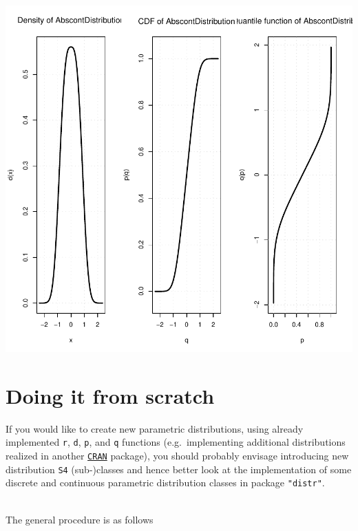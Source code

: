 \documentclass[10pt]{article}
\def\pkg#1{{\tt "#1"}}
\begin{document}
\includegraphics{newDistributions-AbscDist}
%
\section{Doing it from scratch}
If you would like to create new parametric distributions, using already 
implemented {\tt r}, {\tt d}, {\tt p}, and {\tt q} functions
(e.g.\ implementing additional distributions realized in another 
\href{http://cran.r-project.org}{\tt CRAN} package), 
you should probably envisage introducing new distribution {\tt S4} (sub-)classes
and hence better look at the implementation of some discrete and 
continuous parametric distribution classes in package \pkg{distr}.

\smallskip\\

The general procedure is as follows
\end{document}
